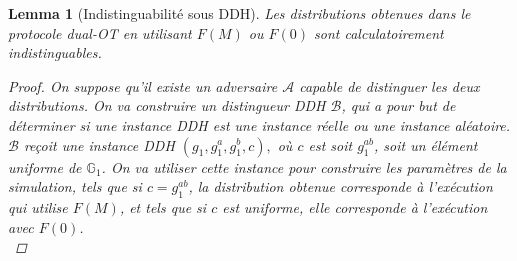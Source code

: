 \documentclass[10pt,a4paper]{article}
\theoremstyle{definition}
\theoremstyle{plain}
\newtheorem{lemma}[definition]{Lemma}
\theoremstyle{remark}
\begin{document}
\begin{lemma}[Indistinguabilité sous DDH] \label{lem:ddh-waters}
Les distributions obtenues dans le protocole dual-OT en utilisant 
$F(M)$ ou $F(0)$ sont calculatoirement indistinguables.

\begin{proof}

On suppose qu'il existe un adversaire $\mathcal{A}$ capable de distinguer
les deux distributions.
On va construire un distingueur DDH $\mathcal{B}$, qui a pour but de déterminer
si une instance DDH est une instance réelle ou une instance aléatoire.
$\mathcal{B}$ reçoit une instance DDH
$
(g_1,g_1^a,g_1^b,c),
$
où $c$ est soit $g_1^{ab}$, soit un élément uniforme
de $\mathbb{G}_1$.
On va utiliser cette instance pour construire les paramètres de la simulation,
tels que si $c=g_1^{ab}$, la distribution obtenue corresponde à l'exécution qui utilise
$F(M)$, et tels que si $c$ est uniforme, elle corresponde à l'exécution avec
$F(0)$.\\


\end{proof}
\end{lemma}
\end{document}
